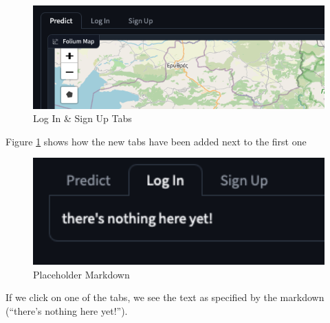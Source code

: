 \documentclass[12pt]{report}
\begin{document}
\begin{figure}[H]
\centering
\includegraphics[width=12cm]{ss14.2.png}
\caption{Log In \& Sign Up Tabs}\label{fig:ss14.2}
\end{figure}

Figure \ref{fig:ss14.2} shows how the new tabs have been added next to the first one

\begin{figure}[H]
\centering
\includegraphics[width=12cm]{ss14.3.png}
\caption{Placeholder Markdown}\label{fig:ss14.3}
\end{figure}

If we click on one of the tabs, we see the text as specified by the markdown (``there's nothing here yet!'').

\begin{center}
\end{center}
\end{document}

